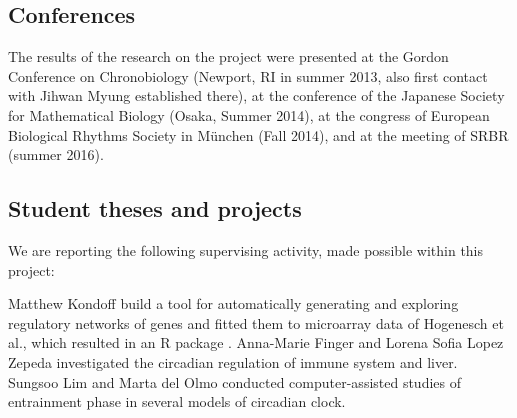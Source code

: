 \documentclass[a4paper]{article}
\begin{document}
\subsection{Conferences}
The results of the research on the project were presented at the
Gordon Conference on Chronobiology (Newport, RI in summer 2013, also
first contact with Jihwan Myung established there), at the conference
of the Japanese Society for Mathematical Biology (Osaka, Summer 2014),
at the congress of European Biological Rhythms Society in M\"unchen
(Fall 2014), and at the meeting of SRBR (summer 2016).

\subsection{Student theses and projects}
We are reporting the following supervising activity, made possible
within this project:

Matthew Kondoff build a tool for automatically generating and
exploring regulatory networks of genes and fitted them to microarray
data of Hogenesch et al., which resulted in an R package
\cite{kondoff2015modeling}. Anna-Marie Finger and Lorena Sofia Lopez
Zepeda investigated the circadian regulation of immune system and
liver. Sungsoo Lim and Marta del Olmo conducted computer-assisted
studies of entrainment phase in several models of circadian clock.




\end{document}
